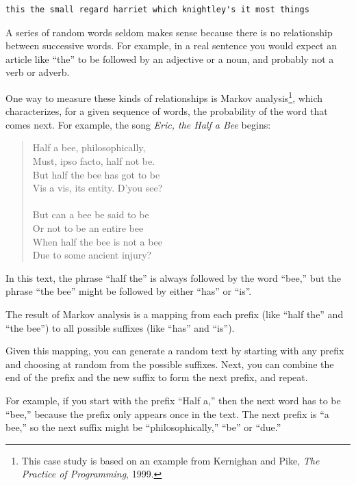 \documentclass[10pt]{book}
\begin{document}
{\beforeverb
\begin{verbatim}
this the small regard harriet which knightley's it most things
\end{verbatim}
\afterverb
%
A series of random words seldom makes sense because there
is no relationship between successive words.  For example, in
a real sentence you would expect an article like ``the'' to
be followed by an adjective or a noun, and probably not a verb
or adverb.

One way to measure these kinds of relationships is Markov
analysis\footnote{This case study is based on an example from
  Kernighan and Pike, {\em The Practice of Programming}, 1999.}, which
characterizes, for a given sequence of words, the probability of the
word that comes next.  For example, the song {\em Eric, the Half a
  Bee} begins:

\begin{quote}
Half a bee, philosophically, \\
Must, ipso facto, half not be. \\
But half the bee has got to be \\
Vis a vis, its entity. D'you see? \\
\\
But can a bee be said to be \\
Or not to be an entire bee \\
When half the bee is not a bee \\
Due to some ancient injury? \\
\end{quote}
%
In this text,
the phrase ``half the'' is always followed by the word ``bee,''
but the phrase ``the bee'' might be followed by either
``has'' or ``is''.


The result of Markov analysis is a mapping from each prefix
(like ``half the'' and ``the bee'') to all possible suffixes
(like ``has'' and ``is'').


Given this mapping, you can generate a random text by
starting with any prefix and choosing at random from the
possible suffixes.  Next, you can combine the end of the
prefix and the new suffix to form the next prefix, and repeat.

For example, if you start with the prefix ``Half a,'' then the
next word has to be ``bee,'' because the prefix only appears
once in the text.  The next prefix is ``a bee,'' so the
next suffix might be ``philosophically,'' ``be'' or ``due.''

}
\end{document}
